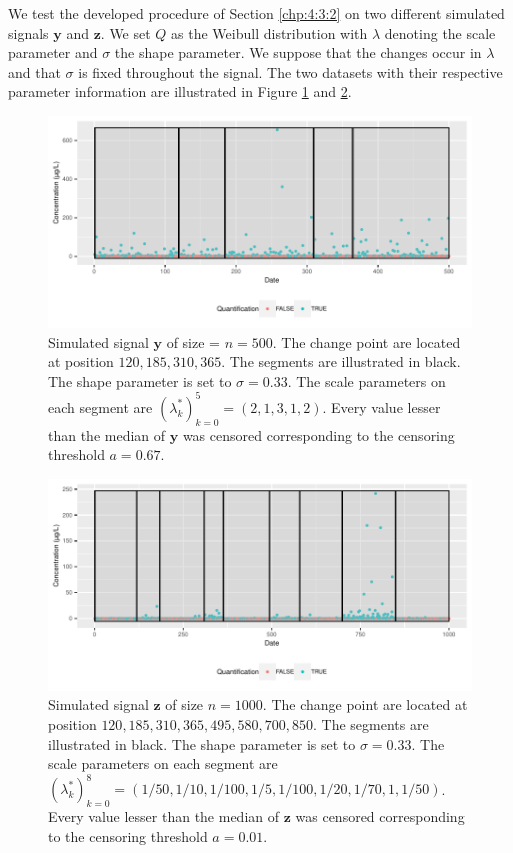 We test the developed procedure of Section \ref{chp:4:3:2} on two different simulated signals $\bm y$ and $\bm z$. We set $Q$ as the Weibull distribution with $\lambda$ denoting the scale parameter and $\sigma$ the shape parameter. We suppose that the changes occur in $\lambda$ and that $\sigma$ is fixed throughout the signal. The two datasets with their respective parameter information are illustrated in Figure \ref{fig:y_sim1} and \ref{fig:y_sim2}. 

\begin{figure}[htbp]
    \centering
    \includegraphics{figs/Chap4/y_sim1.pdf}
    \caption{Simulated signal $\bm y$ of size = $n = 500$. The change point are located at position $120,185,310,365$. The segments are illustrated in black. The shape parameter is set to $\sigma = 0.33$. The scale parameters on each segment are $(\lambda^*_k)_{k = 0}^5 = (2,1,3,1,2)$. Every value lesser than the median of $\bm y$ was censored corresponding to the censoring threshold $a = 0.67$.}
    \label{fig:y_sim1}
\end{figure}

\begin{figure}[htbp]
    \centering
    \includegraphics{figs/Chap4/y_sim2.pdf}
    \caption{Simulated signal $\bm z$ of size $n = 1000$. The change point are located at position $ 120, 185, 310, 365, 495, 580, 700, 850 $. The segments are illustrated in black. The shape parameter is set to $\sigma = 0.33$. The scale parameters on each segment are $(\lambda^*_k)_{k = 0}^8 = (1/50, 1/10, 1/100, 1/5, 1/100, 1/20, 1/70,1, 1/50)$. Every value lesser than the median of $\bm z$ was censored corresponding to the censoring threshold $a = 0.01$.}
    \label{fig:y_sim2}
\end{figure}

